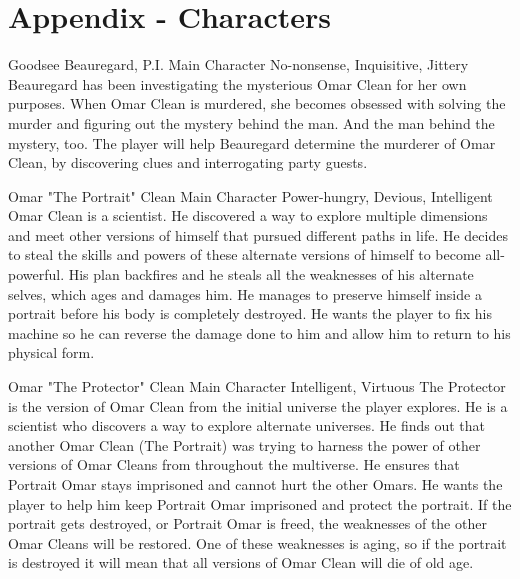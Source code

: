 \chapter{Appendix - Characters}
\label{app:characters}

\BgPinktrue

{Goodsee Beauregard, P.I.}
{Main Character}
{No-nonsense, Inquisitive, Jittery}
{Beauregard has been investigating the mysterious Omar Clean for her own purposes. When Omar Clean is murdered, she becomes obsessed with solving the murder and figuring out the mystery behind the man. And the man behind the mystery, too.}
{The player will help Beauregard determine the murderer of Omar Clean, by discovering clues and interrogating party guests.}

{Omar "The Portrait" Clean}
{Main Character}
{Power-hungry, Devious, Intelligent}
{Omar Clean is a scientist. He discovered a way to explore multiple dimensions and meet other versions of himself that pursued different paths in life. He decides to steal the skills and powers of these alternate versions of himself to become all-powerful. His plan backfires and he steals all the weaknesses of his alternate selves, which ages and damages him. He manages to preserve himself inside a portrait before his body is completely destroyed.}
{He wants the player to fix his machine so he can reverse the damage done to him and allow him to return to his physical form.}

{Omar "The Protector" Clean}
{Main Character}
{Intelligent, Virtuous}
{The Protector is the version of Omar Clean from the initial universe the player explores. He is a scientist who discovers a way to explore alternate universes. He finds out that another Omar Clean (The Portrait) was trying to harness the power of other versions of Omar Cleans from throughout the multiverse. He ensures that Portrait Omar stays imprisoned and cannot hurt the other Omars.}
{He wants the player to help him keep Portrait Omar imprisoned and protect the portrait. If the portrait gets destroyed, or Portrait Omar is freed, the weaknesses of the other Omar Cleans will be restored. One of these weaknesses is aging, so if the portrait is destroyed it will mean that all versions of Omar Clean will die of old age.}

